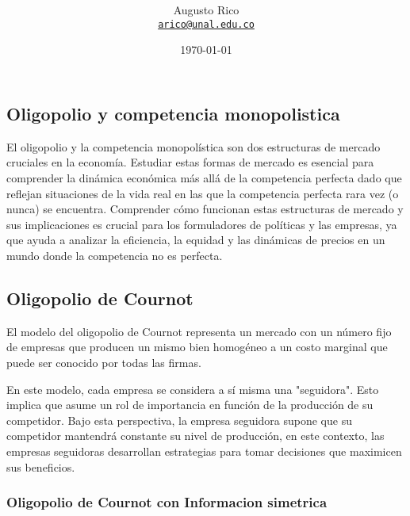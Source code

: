 \documentclass[11pt]{article}
\title{\text{Microeconomia III - $6^a$ Monitoria}
}
\author{Augusto Rico\\%
    \href{mailto:arico@unal.edu.co}{\texttt{arico@unal.edu.co}}
    }
\date{\today}
\begin{document}
\maketitle


\begin{flushleft}
\section{Oligopolio y competencia monopolistica}

El oligopolio y la competencia monopolística son dos estructuras de mercado cruciales en la economía. Estudiar estas formas de mercado es esencial para comprender la dinámica económica más allá de la competencia perfecta dado que reflejan situaciones de la vida real en las que la competencia perfecta rara vez (o nunca) se encuentra. Comprender cómo funcionan estas estructuras de mercado y sus implicaciones es crucial para los formuladores de políticas y las empresas, ya que ayuda a analizar la eficiencia, la equidad y las dinámicas de precios en un mundo donde la competencia no es perfecta.

\subsection{Oligopolio de Cournot}

    El modelo del oligopolio de Cournot representa un mercado con un número fijo de empresas que producen un mismo bien homogéneo a un costo marginal que puede ser conocido por todas las firmas.
    
    En este modelo, cada empresa se considera a sí misma una "seguidora". Esto implica que asume un rol de importancia en función de la producción de su competidor. Bajo esta perspectiva, la empresa seguidora supone que su competidor mantendrá constante su nivel de producción, en este contexto, las empresas seguidoras desarrollan estrategias para tomar decisiones que maximicen sus beneficios.
    
\subsubsection{Oligopolio de Cournot con Informacion simetrica}


\end{flushleft}
\end{document}
